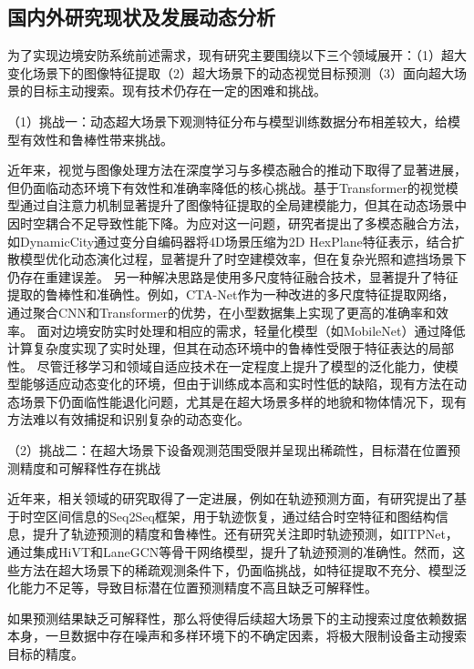 \subsection{国内外研究现状及发展动态分析}

为了实现边境安防系统前述需求，现有研究主要围绕以下三个领域展开：（1）超大变化场景下的图像特征提取（2）超大场景下的动态视觉目标预测（3）面向超大场景的目标主动搜索。现有技术仍存在一定的困难和挑战。

（1）挑战一：动态超大场景下观测特征分布与模型训练数据分布相差较大，给模型有效性和鲁棒性带来挑战。


近年来，视觉与图像处理方法在深度学习与多模态融合的推动下取得了显著进展，但仍面临动态环境下有效性和准确率降低的核心挑战。基于Transformer的视觉模型\cite{dosovitskiy2020image,carion2020end,liu2021swin,zhu2021deformable,zheng2021rethinking,bao2021beit,he2021masked,liu2021tokens,wang2021pyramid}通过自注意力机制显著提升了图像特征提取的全局建模能力，但其在动态场景中因时空耦合不足导致性能下降。为应对这一问题，研究者提出了多模态融合方法，如DynamicCity\cite{dynamiccity2025}通过变分自编码器将4D场景压缩为2D HexPlane特征表示，结合扩散模型优化动态演化过程，显著提升了时空建模效率，但在复杂光照和遮挡场景下仍存在重建误差。
另一种解决思路是使用多尺度特征融合技术，显著提升了特征提取的鲁棒性和准确性。例如，CTA-Net\cite{Meng2024CTA-Net}作为一种改进的多尺度特征提取网络，通过聚合CNN和Transformer的优势，在小型数据集上实现了更高的准确率和效率。
面对边境安防实时处理和相应的需求，轻量化模型（如MobileNet\cite{sandler2018mobilenetv2,howard2019searching}）通过降低计算复杂度实现了实时处理，但其在动态环境中的鲁棒性受限于特征表达的局部性。
尽管迁移学习和领域自适应技术在一定程度上提升了模型的泛化能力，使模型能够适应动态变化的环境，但由于训练成本高和实时性低的缺陷，现有方法在动态场景下仍面临性能退化问题，尤其是在超大场景多样的地貌和物体情况下，现有方法难以有效捕捉和识别复杂的动态变化。

（2）挑战二：在超大场景下设备观测范围受限并呈现出稀疏性，目标潜在位置预测精度和可解释性存在挑战

近年来，相关领域的研究取得了一定进展，例如在轨迹预测方面，有研究提出了基于时空区间信息的Seq2Seq\cite{Seq2SeqTrajRec}框架，用于轨迹恢复，通过结合时空特征和图结构信息，提升了轨迹预测的精度和鲁棒性。还有研究关注即时轨迹预测，如ITPNet\cite{ITPNet}，通过集成HiVT和LaneGCN等骨干网络模型，提升了轨迹预测的准确性。然而，这些方法在超大场景下的稀疏观测条件下，仍面临挑战，如特征提取不充分、模型泛化能力不足等，导致目标潜在位置预测精度不高且缺乏可解释性。

如果预测结果缺乏可解释性，那么将使得后续超大场景下的主动搜索过度依赖数据本身，一旦数据中存在噪声和多样环境下的不确定因素，将极大限制设备主动搜索目标的精度。


